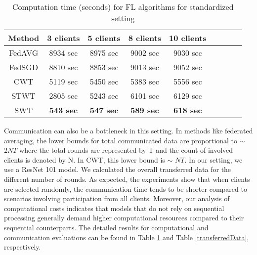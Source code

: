 \begin{table}[h!]
\label{computation time}
\centering
\setlength{\tabcolsep}{7pt}
\renewcommand\arraystretch{1.22}
\caption{ \small Computation time (seconds) for FL algorithms for standardized setting}
\begin{tabular}{| *{9}{c|} }
\hline
Method & 3 clients & 5 clients & 8 clients  & 10 clients
\\   \hline  
FedAVG
 & 8934 sec&8975 sec  & 9002 sec & 9030 sec\\

\hline  
FedSGD
 & 8810 sec &8853 sec& 9013 sec & 9052 sec \\
\hline  
CWT
 &  5119 sec& 5450 sec&5383 sec & 5556 sec\\
 \hline
STWT &
2805 sec&  5243 sec& 6101 sec & 6129 sec\\
 \hline  
SWT
 & \textbf{543 sec} &\textbf{547 sec} & \textbf{589 sec } & \textbf{618 sec}\\




\hline  

\end{tabular}
\label{computation_time} 
\end{table}


Communication can also be a bottleneck in this setting. In methods like federated averaging, the lower bounds for total communicated data are proportional to $\sim$
${2NT}$
where the total rounds are represented by T and the count of involved clients is denoted by N. In CWT, this lower bound is  $\sim$ ${NT}$. In our setting, we use a ResNet 101 model. We calculated the overall transferred data for the different number of rounds. As expected, the experiments show that when clients are selected randomly, the communication time tends to be shorter compared to scenarios involving participation from all clients. Moreover, our analysis of computational costs indicates that models that do not rely on sequential processing generally demand higher computational resources compared to their sequential counterparts. The detailed results for computational and communication evaluations can be found in Table \ref{computation_time} and Table \ref{transferredData}, respectively.

